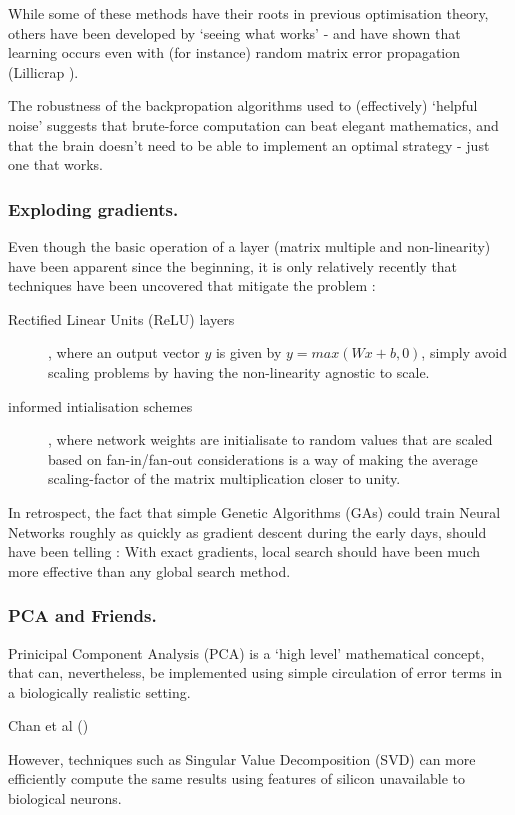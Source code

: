 \documentclass[citeauthoryear]{llncs}
\begin{document}
While some of these methods have their roots in previous optimisation theory, 
others have been developed by `seeing what works' - and have shown that 
learning occurs even with (for instance) random matrix error propagation 
(Lillicrap \cite{Lillicrap-random-matrix}).

The robustness of the backpropation algorithms used to (effectively) `helpful noise'
suggests that brute-force computation can beat elegant mathematics, and that 
the brain doesn't need to be able to implement an optimal strategy - just one that works.


\subsubsection*{Exploding gradients.}

Even though the basic operation of a layer (matrix multiple and non-linearity) 
have been apparent since the beginning, it is only relatively recently that 
techniques have been uncovered that mitigate the problem : 
\begin{description}
\item[Rectified Linear Units (ReLU) layers] , where an output vector $y$ is given by $y=max(Wx+b, 0)$, simply 
avoid scaling problems by having the non-linearity agnostic to scale.
\item[informed intialisation schemes], where network weights are initialisate 
to random values that are scaled based on fan-in/fan-out considerations is a way of making the 
average scaling-factor of the matrix multiplication closer to unity.
\end{description}

In retrospect, the fact that simple Genetic Algorithms (GAs) could train 
Neural Networks roughly as quickly as gradient descent during the early days, 
should have been telling : With exact gradients, local search should have 
been much more effective than any global search method.


\subsubsection*{PCA and Friends.}

Prinicipal Component Analysis (PCA) is a `high level' mathematical concept, 
that can, nevertheless, be implemented using simple circulation of error terms
in a biologically realistic setting.

Chan et al (\cite{PCAnet})

However, techniques such as Singular Value Decomposition (SVD) can more 
efficiently compute the same results using features of silicon unavailable to biological neurons.
\end{document}
